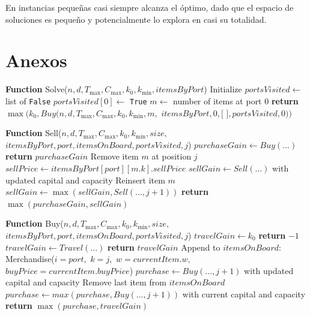 \documentclass[12pt, a4paper]{article}
\begin{document}
En instancias pequeñas casi siempre alcanza el óptimo, dado que el espacio de soluciones es pequeño y potencialmente lo explora en casi su totalidad.

\newpage
\section*{\LARGE{Anexos}}

\begin{algorithm}
\caption{Fuerza Bruta. Joel Aaparicio Tamayo}\label{alg:jat}
\end{algorithm}
\begin{algorithmic}[1]

\STATE \textbf{Function} Solve($n, d, T_{\max}, C_{\max}, k_0, k_{\min}, itemsByPort$)
\STATE Initialize $portsVisited \gets$ list of \texttt{False}
\STATE $portsVisited[0] \gets$ \texttt{True}
\STATE $m \gets$ number of items at port 0
\STATE \textbf{return} $\max(k_0, Buy(n, d, T_{\max}, C_{\max}, k_0, k_{\min}, m,$
\STATE \hspace{1cm} $itemsByPort, 0, \text{[ ]}, portsVisited, 0))$

\STATE

\STATE \textbf{Function} Sell($n, d, T_{\max}, C_{\max}, k_0, k_{\min}, size,$
\STATE \hspace{1cm} $itemsByPort, port, itemsOnBoard, portsVisited, j$)
\STATE $purchaseGain \gets Buy(...)$
    \STATE \textbf{return} $purchaseGain$
\ENDIF
{}
    \STATE Remove item $m$ at position $j$
    \STATE $sellPrice \gets itemsByPort[port][m.k].sellPrice$
    \STATE $sellGain \gets Sell(...)$ with updated capital and capacity
    \STATE Reinsert item $m$
    \STATE $sellGain \gets \max(sellGain, Sell(..., j+1))$
\ENDIF
\STATE \textbf{return} $\max(purchaseGain, sellGain)$

\STATE

\STATE \textbf{Function} Buy($n, d, T_{\max}, C_{\max}, k_0, k_{\min}, size,$
\STATE \hspace{1cm} $itemsByPort, port, itemsOnBoard, portsVisited, j$)
\STATE $travelGain \gets k_0$
    \STATE \textbf{return} $-1$
\ENDIF
\STATE $travelGain \gets Travel(...)$
    \STATE \textbf{return} $travelGain$
\ENDIF
{}
    \STATE Append to $itemsOnBoard$: Merchandise($i=port,$ $k=j,$
    \STATE \hspace{1cm} $w=currentItem.w,$
    $buyPrice=currentItem.buyPrice$)
    \STATE $purchase \gets Buy(...,  j+1)$ with updated capital and capacity
    \STATE Remove last item from $itemsOnBoard$ 
\ENDIF
\STATE $purchase \gets max(purchase, Buy(..., j + 1))$ with current capital and capacity
\STATE \textbf{return} $\max(purchase, travelGain)$


\end{algorithmic}
\end{document}

